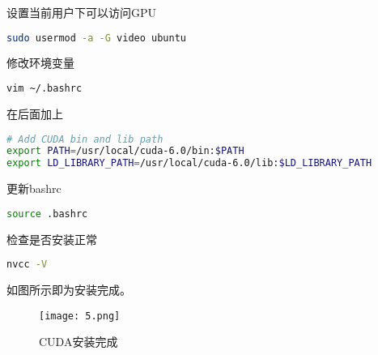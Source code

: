 \documentclass[openany]{ctexbook}
\newcommand{\warn}[1] {\fcolorbox{red!20}{red!20} {\color{red} #1}}
\begin{document}
设置当前用户下可以访问GPU
{\setmainfont{Courier New Bold}                          %
\begin{lstlisting}[language=bash]
sudo usermod -a -G video ubuntu
\end{lstlisting}}

\warn{修改环境变量}
{\setmainfont{Courier New Bold}                          %
\begin{lstlisting}[language=bash]
vim ~/.bashrc
\end{lstlisting}}

在后面加上
{\setmainfont{Courier New Bold}                          %
\begin{lstlisting}[language=bash]
# Add CUDA bin and lib path
export PATH=/usr/local/cuda-6.0/bin:$PATH
export LD_LIBRARY_PATH=/usr/local/cuda-6.0/lib:$LD_LIBRARY_PATH
\end{lstlisting}}

更新bashrc
{\setmainfont{Courier New Bold}                          %
\begin{lstlisting}[language=bash]
source .bashrc
\end{lstlisting}}

检查是否安装正常
{\setmainfont{Courier New Bold}                          %
\begin{lstlisting}[language=bash]
nvcc -V
\end{lstlisting}}
如图所示即为安装完成。

\begin{figure}[h]
  \centering
  \texttt{[image: 5.png]}
  \caption{CUDA安装完成}
\end{figure}

\pagebreak
\end{document}
